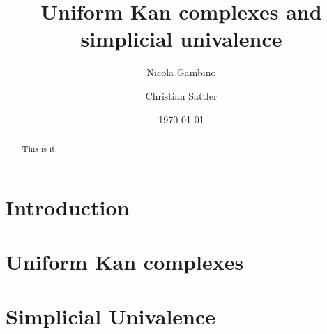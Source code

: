 \documentclass[reqno,10pt,a4paper,oneside]{amsart}
\author[N. Gambino]{Nicola Gambino}
\author[C. Sattler]{Christian Sattler}
\title[Uniform Kan complexes and simplicial univalence]{Uniform Kan complexes and simplicial univalence}
\date{\today}
\begin{document}
\begin{abstract}
This is it.
\end{abstract}

\maketitle



\newpage

\section{Introduction}


\newpage

\section{Uniform Kan complexes}

\newpage

\section{Simplicial Univalence}
\end{document}
